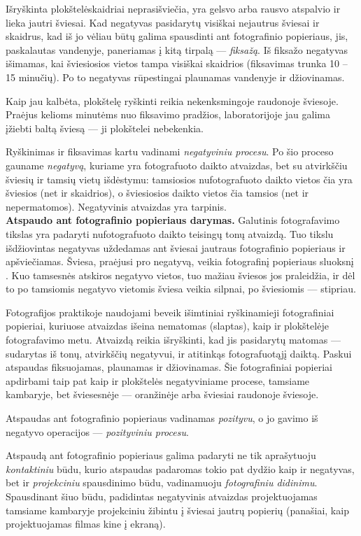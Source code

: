 \documentclass{book}
\begin{document}
			Išryškinta plokštelėskaidriai neprasišviečia, yra gelsvo arba rausvo atspalvio ir lieka jautri šviesai. Kad negatyvas pasidarytų visiškai nejautrus šviesai ir skaidrus, kad iš jo vėliau būtų galima spausdinti ant fotografinio popieriaus, jis, paskalautas vandenyje, paneriamas į kitą tirpalą --- \textit{fiksažą}. Iš fiksažo negatyvas išimamas, kai šviesiosios vietos tampa visiškai skaidrios (fiksavimas trunka 10 -- 15 minučių). Po to negatyvas rūpestingai plaunamas vandenyje ir džiovinamas.

			Kaip jau kalbėta, plokštelę ryškinti reikia nekenksmingoje raudonoje šviesoje. Praėjus kelioms minutėms nuo fiksavimo pradžios, laboratorijoje jau galima įžiebti baltą šviesą --- ji plokštelei nebekenkia.

			Ryškinimas ir fiksavimas kartu vadinami \textit{negatyviniu procesu}. Po šio proceso gauname \textit{negatyvą}, kuriame yra fotografuoto daikto atvaizdas, bet su atvirkščiu šviesių ir tamsių vietų išdėstymu: tamsiosios nufotografuoto daikto vietos čia yra šviesios (net ir skaidrios), o šviesiosios daikto vietos čia tamsios (net ir nepermatomos). Negatyvinis atvaizdas yra tarpinis.\\

			\textbf{Atspaudo ant fotografinio popieriaus darymas.} Galutinis fotografavimo tikslas yra padaryti nufotografuoto daikto teisingų tonų atvaizdą. Tuo tikslu išdžiovintas negatyvas uždedamas ant šviesai jautraus fotografinio popieriaus ir apšviečiamas. Šviesa, praėjusi pro negatyvą, veikia fotografinį popieriaus sluoksnį . Kuo tamsesnės atskiros negatyvo vietos, tuo mažiau šviesos jos praleidžia, ir dėl to po tamsiomis negatyvo vietomis šviesa veikia silpnai, po šviesiomis --- stipriau.

			Fotografijos praktikoje naudojami beveik išimtiniai ryškinamieji fotografiniai popieriai, kuriuose atvaizdas išeina nematomas (slaptas), kaip ir plokštelėje fotografavimo metu. Atvaizdą reikia išryškinti, kad jis pasidarytų matomas --- sudarytas iš tonų, atvirkščių negatyvui, ir atitinkąs fotografuotąjį daiktą. Paskui atspaudas fiksuojamas, plaunamas ir džiovinamas. Šie fotografiniai popieriai apdirbami taip pat kaip ir plokštelės negatyviniame procese, tamsiame kambaryje, bet šviesesnėje --- oranžinėje arba šviesiai raudonoje šviesoje.

			Atspaudas ant fotografinio popieriaus vadinamas \textit{pozityvu}, o jo gavimo iš negatyvo operacijos --- \textit{pozityviniu procesu}.

			Atspaudą ant fotografinio popieriaus galima padaryti ne tik aprašytuoju \textit{kontaktiniu} būdu, kurio atspaudas padaromas tokio pat dydžio kaip ir negatyvas, bet ir \textit{projekciniu} spausdinimo būdu, vadinamuoju \textit{fotografiniu didinimu}. Spausdinant šiuo būdu, padidintas negatyvinis atvaizdas projektuojamas tamsiame kambaryje projekciniu žibintu į šviesai jautrų popierių (panašiai, kaip projektuojamas filmas kine į ekraną).
\end{document}
